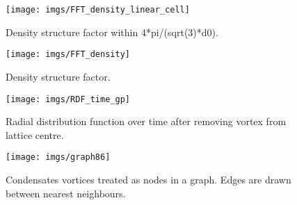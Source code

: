 \begin{figure}[bt]
	\texttt{[image: imgs/FFT\_density\_linear\_cell]}
	\caption{Density structure factor within 4*pi/(sqrt(3)*d0).}
\end{figure}



\begin{figure}[htb]
	\texttt{[image: imgs/FFT\_density]}
	\caption{Density structure factor.}
\end{figure}


\begin{figure}[tb]
	\texttt{[image: imgs/RDF\_time\_gp]}
	\caption{Radial distribution function over time after removing vortex from lattice centre. }
\end{figure}


\begin{figure}[tb]
	\texttt{[image: imgs/graph86]}
	\caption{Condensates vortices treated as nodes in a graph. Edges are drawn between nearest neighbours.}
\end{figure}




